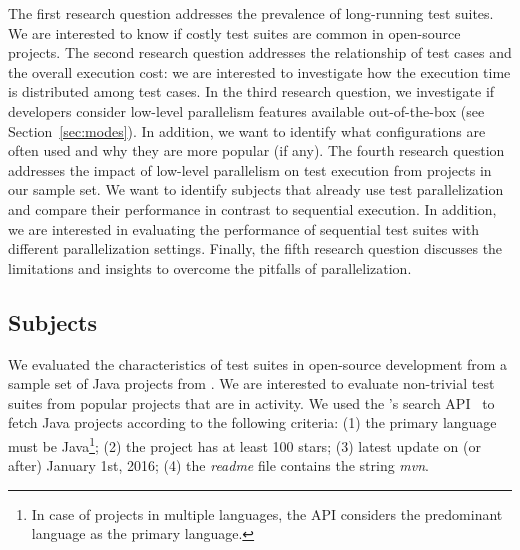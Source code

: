The first research question addresses the prevalence of long-running
test suites. We are interested to know if costly test suites are
common in open-source projects.  The second research question
addresses the relationship of test cases and the overall execution
cost: we are interested to investigate how the execution time is
distributed among test cases.  In the third research question, we
investigate if developers consider low-level parallelism features
available out-of-the-box (see Section~\ref{sec:modes}). In addition,
we want to identify what configurations are often used and why they
are more popular (if any).  The fourth research question addresses the
impact of low-level parallelism on test execution from projects in our
sample set. We want to identify subjects that already use test
parallelization and compare their performance in contrast to
sequential execution. In addition, we are interested in evaluating the
performance of sequential test suites with different parallelization
settings.
Finally, the fifth research question discusses the limitations and
insights to overcome the pitfalls of parallelization.


\subsection{Subjects}
\label{sec:subjects}

We evaluated the characteristics of test suites in open-source
development from a sample set of Java projects from \github{}.  We are
interested to evaluate non-trivial test suites from popular projects
that are in activity. We used the \github{}'s search
API~\cite{githubsearch} to fetch Java projects according to the
following criteria: (1) the primary language must be Java\footnote{In
case of projects in multiple languages, the \github{} API considers
the predominant language as the primary language.}; (2) the project
has at least 100 stars; (3) latest update on (or after) January 1st,
2016; (4) the \emph{readme} file contains the string \emph{mvn}.

